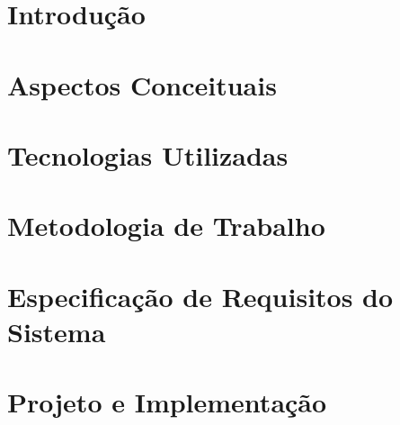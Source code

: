 \documentclass[]{politex}
\begin{document}
\part{Introdução}






\part{Aspectos Conceituais}







\part{Tecnologias Utilizadas}





\part{Metodologia de Trabalho}




\part{Especificação de Requisitos do Sistema}





\part{Projeto e Implementação}



\end{document}
